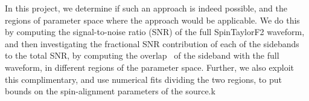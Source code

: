In this project, we determine if such an approach is indeed possible, and the
regions of  parameter space where the approach would be applicable. We do this
by computing the signal-to-noise ratio (SNR) of the full SpinTaylorF2
waveform, and then investigating the fractional SNR contribution of each of
the sidebands to the total SNR, by computing the overlap~\cite{Creighton} of
the sideband with the full waveform, in different regions of the parameter
space. Further, we also exploit this complimentary, and use numerical fits
dividing the two regions, to put bounds on the spin-alignment parameters of
the source.k